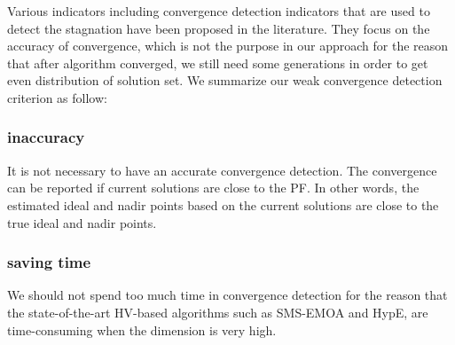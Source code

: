 \documentclass[conference]{IEEEtran}
\begin{document}
%
%
%
Various indicators including convergence detection indicators that are used to detect the stagnation 
have been proposed in the literature\cite{convergenceDetection:1, convergenceDetection:LSSC, 
convergenceDetection:OCD, convergenceDetection:OFCDandOCD, convergenceDetection:convergenceMetric, 
convergenceDetection:maxCD, convergenceDetection:online}. 
They focus on the accuracy of convergence, which is not the purpose in our approach for 
the reason that after algorithm converged, we still need some generations in order to
get even distribution of solution set. 
We summarize our weak convergence detection criterion as follow:
\subsubsection{inaccuracy} It is not necessary to have an accurate convergence detection. 
The convergence can be reported if current solutions are close to the PF.
In other words, the estimated ideal and nadir points based on the current solutions
are close to the true ideal and nadir points. 
\subsubsection{saving time} We should not spend too much time in convergence detection
for the reason that the state-of-the-art HV-based algorithms such as SMS-EMOA and HypE, 
are time-consuming when the dimension is very high. 
\end{document}
